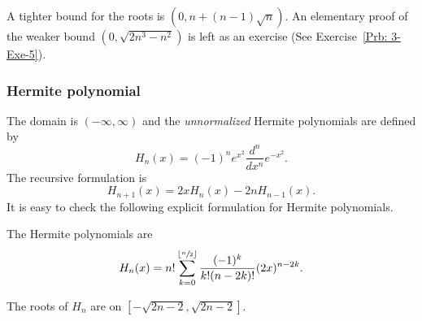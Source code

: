\begin{remark}
    A tighter bound for the roots is $(0, n + (n-1)\sqrt{n})$. An elementary proof of the weaker bound $(0, \sqrt{2n^3 - n^2})$ is left as an exercise (See Exercise~\ref{Prb: 3-Exe-5}).
\end{remark}

\subsubsection{Hermite polynomial}
\label{SSSec: 3-Her-Pol}
The domain is $(-\infty, \infty)$ and the \emph{unnormalized} Hermite polynomials are defined by 
\begin{equation}
    H_{n}(x) = (-1)^n e^{x^2} \frac{d^n}{d x^n} e^{-x^2}.
\end{equation}
The recursive formulation is 
$$H_{n+1}(x) = 2x H_n(x) - 2n H_{n-1}(x).$$
It is easy to check the following explicit formulation for Hermite polynomials.
\begin{theorem}
\label{Thm: 3-Her-Pol-For}
    The Hermite polynomials are 
    \begin{equation}
        H_n(x) = 
            n! \sum_{k=0}^{\lfloor\sfrac{n}{2}\rfloor} \frac{(-1)^{k}}{k! (n - 2k)!} (2x)^{n - 2k}.
    \end{equation}
\end{theorem}
\begin{corollary}
\label{Cor: 3-Her-Roo}
    The roots of $H_n$ are on $[-\sqrt{2n-2}, \sqrt{2n - 2}]$.
\end{corollary}
